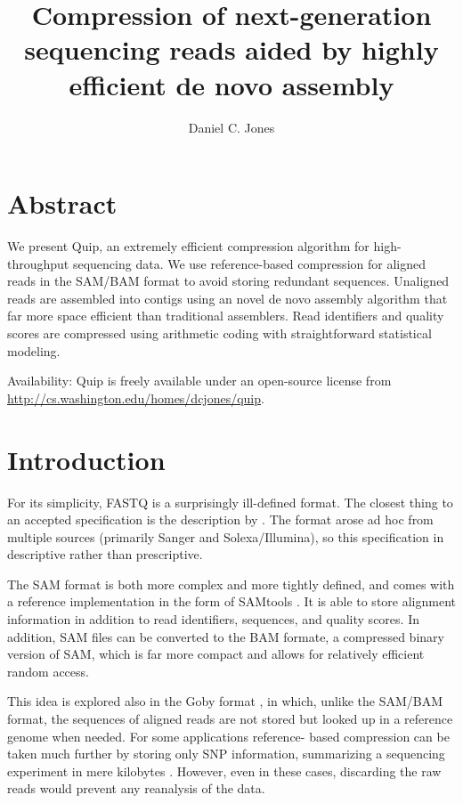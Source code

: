 \documentclass[twocolumn]{article}
\title{Compression of next-generation sequencing reads aided by highly efficient de novo assembly}
\author{Daniel C. Jones}
\begin{document}
\maketitle

\section{Abstract}

We present Quip, an extremely efficient compression algorithm for
high-throughput sequencing data.  We use reference-based compression for aligned
reads in the SAM/BAM format to avoid storing redundant sequences.  Unaligned
reads are assembled into contigs using an novel de novo assembly algorithm that
far more space efficient than traditional assemblers.  Read identifiers and
quality scores are compressed using arithmetic coding with straightforward
statistical modeling.

Availability: Quip is freely available under an open-source license from
\url{http://cs.washington.edu/homes/dcjones/quip}.


\section{Introduction}





For its simplicity, FASTQ is a surprisingly ill-defined format. The closest
thing to an accepted specification is the description by \citet{Cock2010}. The
format arose ad hoc from multiple sources (primarily Sanger and
Solexa/Illumina), so this specification in descriptive rather than
prescriptive.

The SAM format is both more complex and more tightly defined, and comes with a
reference implementation in the form of SAMtools \citep{Li2009b}. It is able to
store alignment information in addition to read identifiers, sequences, and
quality scores. In addition, SAM files can be converted to the BAM formate, a
compressed binary version of SAM, which is far more compact and allows for
relatively efficient random access. 



This idea is explored also in the Goby format \citep{Goby2012}, in which,
unlike the SAM/BAM format, the sequences of aligned reads are not stored but
looked up in a reference genome when needed. For some applications reference-
based compression can be taken much further by storing only SNP information,
summarizing a sequencing experiment in mere kilobytes \citep{Christley2009}.
However, even in these cases, discarding the raw reads would prevent any
reanalysis of the data. 
\end{document}
